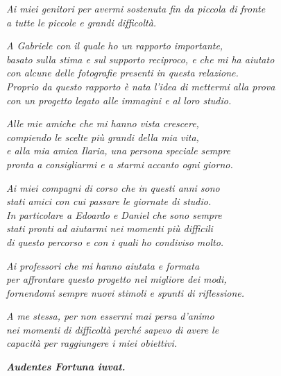 \thispagestyle{plain}
\begin{midpage}
\begin{flushright}
\textit{
Ai miei genitori per avermi sostenuta fin da piccola di fronte\\a tutte le piccole e grandi difficoltà.}
\bigskip

\textit{
A Gabriele con il quale ho un rapporto importante,\\ basato sulla stima e sul supporto reciproco, e che mi ha aiutato \\con alcune delle fotografie presenti in questa relazione. \\Proprio da questo rapporto è nata l'idea di mettermi alla prova \\con un progetto legato alle immagini e al loro studio.}
\bigskip

\textit{
Alle mie amiche che mi hanno vista crescere, \\compiendo le scelte più grandi della mia vita,\\ e alla mia amica Ilaria, una persona speciale sempre \\pronta a consigliarmi e a starmi accanto ogni giorno.}
\bigskip

\textit{
Ai miei compagni di corso che in questi anni sono \\stati amici con cui passare le giornate di studio. \\In particolare a Edoardo e Daniel che sono sempre \\stati pronti ad aiutarmi nei momenti più difficili \\di questo percorso e con i quali ho condiviso molto.}
\bigskip

\textit{
Ai professori che mi hanno aiutata e formata \\per affrontare questo progetto nel migliore dei modi, \\fornendomi sempre nuovi stimoli e spunti di riflessione.}
\bigskip

\textit{
A me stessa, per non essermi mai persa d'animo \\nei momenti di difficoltà perché sapevo di avere le \\capacità per raggiungere i miei obiettivi.}
\medskip

\textit{
\textbf{Audentes Fortuna iuvat.}}

\end{flushright}
\end{midpage}
\restoregeometry